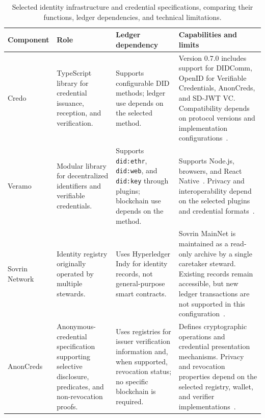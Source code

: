 \begin{table}[htbp]
\centering
\footnotesize
\caption{Selected identity infrastructure and credential specifications, comparing their functions, ledger dependencies, and technical limitations.}
\label{tab:ssi-platforms}
\setlength{\tabcolsep}{3pt}
\renewcommand{\arraystretch}{1.15}
\begin{tabular}{>{\raggedright\arraybackslash}m{}>{\raggedright\arraybackslash}m{}>{\raggedright\arraybackslash}m{}>{\raggedright\arraybackslash}m{}}
\toprule
\textbf{Component} & \textbf{Role} & \textbf{Ledger dependency} & \textbf{Capabilities and limits} \\
\midrule

Credo &
TypeScript library for credential issuance, reception, and verification. &
Supports configurable DID methods; ledger use depends on the selected method. &
Version 0.7.0 includes support for DIDComm, OpenID for Verifiable Credentials, AnonCreds, and SD-JWT VC. Compatibility depends on protocol versions and implementation configurations~\cite{platform-credo}. \\

\addlinespace[5pt]

Veramo &
Modular library for decentralized identifiers and verifiable credentials. &
Supports \texttt{did:ethr}, \texttt{did:web}, and \texttt{did:key} through plugins; blockchain use depends on the method. &
Supports Node.js, browsers, and React Native~\cite{platform-veramo}. Privacy and interoperability depend on the selected plugins and credential formats~\cite{platform-veramo}. \\

\addlinespace[5pt]

Sovrin Network &
Identity registry originally operated by multiple stewards. &
Uses Hyperledger Indy for identity records, not general-purpose smart contracts. &
Sovrin MainNet is maintained as a read-only archive by a single caretaker steward. Existing records remain accessible, but new ledger transactions are not supported in this configuration~\cite{platform-sovrin,platform-indy-node}. \\

\addlinespace[5pt]

AnonCreds &
Anonymous-credential specification supporting selective disclosure, predicates, and non-revocation proofs. &
Uses registries for issuer verification information and, when supported, revocation status; no specific blockchain is required. &
Defines cryptographic operations and credential presentation mechanisms. Privacy and revocation properties depend on the selected registry, wallet, and verifier implementations~\cite{platform-anoncreds}. \\


\end{tabular}
\end{table}
